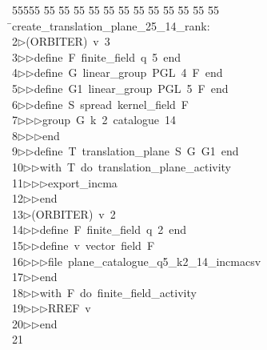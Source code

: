 %
%
\begin{tabbing}
55555 \= 55 \= 55 \= 55 \= 55 \= 55 \= 55 \= 55 \= 55 \= 55 \= 55 \= 55 \= 55 \= \>create\_translation\_plane\_25\_14\_rank:\\[0pt]
2\>$\triangleright$\>(ORBITER)\ v\ 3\ \\[0pt]
3\>$\triangleright$\>$\triangleright$\>define\ F\ finite\_field\ q\ 5\ end\ \\[0pt]
4\>$\triangleright$\>$\triangleright$\>define\ G\ linear\_group\ PGL\ 4\ F\ end\ \\[0pt]
5\>$\triangleright$\>$\triangleright$\>define\ G1\ linear\_group\ PGL\ 5\ F\ end\ \\[0pt]
6\>$\triangleright$\>$\triangleright$\>define\ S\ spread\ kernel\_field\ F\ \\[0pt]
7\>$\triangleright$\>$\triangleright$\>$\triangleright$\>group\ G\ k\ 2\ catalogue\ 14\ \\[0pt]
8\>$\triangleright$\>$\triangleright$\>$\triangleright$\>end\ \\[0pt]
9\>$\triangleright$\>$\triangleright$\>define\ T\ translation\_plane\ S\ G\ G1\ end\ \\[0pt]
10\>$\triangleright$\>$\triangleright$\>with\ T\ do\ translation\_plane\_activity\ \\[0pt]
11\>$\triangleright$\>$\triangleright$\>$\triangleright$\>export\_incma\ \\[0pt]
12\>$\triangleright$\>$\triangleright$\>end\\[0pt]
13\>$\triangleright$\>(ORBITER)\ v\ 2\ \\[0pt]
14\>$\triangleright$\>$\triangleright$\>define\ F\ finite\_field\ q\ 2\ end\ \\[0pt]
15\>$\triangleright$\>$\triangleright$\>define\ v\ vector\ field\ F\ \ \\[0pt]
16\>$\triangleright$\>$\triangleright$\>$\triangleright$\>file\ plane\_catalogue\_q5\_k2\_14\_incmacsv\ \\[0pt]
17\>$\triangleright$\>$\triangleright$\>end\ \\[0pt]
18\>$\triangleright$\>$\triangleright$\>with\ F\ do\ finite\_field\_activity\ \\[0pt]
19\>$\triangleright$\>$\triangleright$\>$\triangleright$\>RREF\ v\ \\[0pt]
20\>$\triangleright$\>$\triangleright$\>end\\[0pt]
21\>\end{tabbing}
